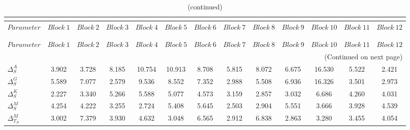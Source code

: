  
\begin{center}
\begin{longtable}{lcccccccccccc} 
\caption{MCMC Inefficiency factors per block}\\
 \label{Table:MCMC_inefficiency_factors}\\
\toprule 
$Parameter             $	 & 	 $     Block~1$	 & 	 $     Block~2$	 & 	 $     Block~3$	 & 	 $     Block~4$	 & 	 $     Block~5$	 & 	 $     Block~6$	 & 	 $     Block~7$	 & 	 $     Block~8$	 & 	 $     Block~9$	 & 	 $    Block~10$	 & 	 $    Block~11$	 & 	 $    Block~12$\\
\midrule \endfirsthead 
\caption{(continued)}\\
 \toprule \\ 
$Parameter             $	 & 	 $     Block~1$	 & 	 $     Block~2$	 & 	 $     Block~3$	 & 	 $     Block~4$	 & 	 $     Block~5$	 & 	 $     Block~6$	 & 	 $     Block~7$	 & 	 $     Block~8$	 & 	 $     Block~9$	 & 	 $    Block~10$	 & 	 $    Block~11$	 & 	 $    Block~12$\\
\midrule \endhead 
\midrule \multicolumn{13}{r}{(Continued on next page)} \\ \bottomrule \endfoot 
\bottomrule \endlastfoot 
$ {\Delta^{A}_{S}}     $	 & 	       3.902	 & 	       3.728	 & 	       8.185	 & 	      10.754	 & 	      10.913	 & 	       8.708	 & 	       5.815	 & 	       8.072	 & 	       6.675	 & 	      16.530	 & 	       5.522	 & 	       2.421 \\ 
$ {\Delta^{G}_{S}}     $	 & 	       5.589	 & 	       7.077	 & 	       2.579	 & 	       9.536	 & 	       8.552	 & 	       7.352	 & 	       2.988	 & 	       5.508	 & 	       6.936	 & 	      16.326	 & 	       3.501	 & 	       2.973 \\ 
$ {\Delta^{K}_{S}}     $	 & 	       2.227	 & 	       3.340	 & 	       5.266	 & 	       5.588	 & 	       5.077	 & 	       4.573	 & 	       3.159	 & 	       2.857	 & 	       3.032	 & 	       6.686	 & 	       4.260	 & 	       4.031 \\ 
$ {\Delta^{M}_{S}}     $	 & 	       4.254	 & 	       4.222	 & 	       3.255	 & 	       2.724	 & 	       5.408	 & 	       5.645	 & 	       2.503	 & 	       2.904	 & 	       5.551	 & 	       3.666	 & 	       3.928	 & 	       4.539 \\ 
$ {\Delta^{M}_{T_N}}   $	 & 	       3.002	 & 	       7.379	 & 	       3.930	 & 	       4.632	 & 	       3.048	 & 	       6.565	 & 	       2.912	 & 	       6.838	 & 	       2.863	 & 	       3.280	 & 	       3.455	 & 	       4.054 \\ 

\end{longtable}
\end{center}
